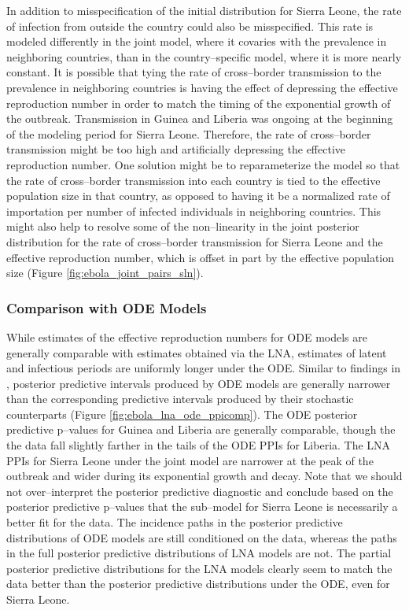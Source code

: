 In addition to misspecification of the initial distribution for Sierra Leone, the rate of infection from outside the country could also be misspecified. This rate is modeled differently in the joint model, where it covaries with the prevalence in neighboring countries, than in the country--specific model, where it is more nearly constant. It is possible that tying the rate of cross--border transmission to the prevalence in neighboring countries is having the effect of depressing the effective reproduction number in order to match the timing of the exponential growth of the outbreak. Transmission in Guinea and Liberia was ongoing at the beginning of the modeling period for Sierra Leone. Therefore, the rate of cross--border transmission might be too high and artificially depressing the effective reproduction number. One solution might be to reparameterize the model so that the rate of cross--border transmission into each country is tied to the effective population size in that country, as opposed to having it be a normalized rate of importation per number of infected individuals in neighboring countries. This might also help to resolve some of the non--linearity in the joint posterior distribution for the rate of cross--border transmission for Sierra Leone and the effective reproduction number, which is offset in part by the effective population size (Figure \ref{fig:ebola_joint_pairs_sln}). 

\subsubsection{Comparison with ODE Models}
\label{subsubsec:lna_ode_comp}

While estimates of the effective reproduction numbers for ODE models are generally comparable with estimates obtained via the LNA, estimates of latent and infectious periods are uniformly longer under the ODE. Similar to findings in \cite{king2015avoidable}, posterior predictive intervals produced by ODE models are generally narrower than the corresponding predictive intervals produced by their stochastic counterparts (Figure \ref{fig:ebola_lna_ode_ppicomp}). The ODE posterior predictive p--values for Guinea and Liberia are generally comparable, though the the data fall slightly farther in the tails of the ODE PPIs for Liberia. The LNA PPIs for Sierra Leone under the joint model are narrower at the peak of the outbreak and wider during its exponential growth and decay. Note that we should not over--interpret the posterior predictive diagnostic and conclude based on the posterior predictive p--values that the sub--model for Sierra Leone is necessarily a better fit for the data. The incidence paths in the posterior predictive distributions of ODE models are still conditioned on the data, whereas the paths in the full posterior predictive distributions of LNA models are not. The partial posterior predictive distributions for the LNA models clearly seem to match the data better than the posterior predictive distributions under the ODE, even for Sierra Leone. 

